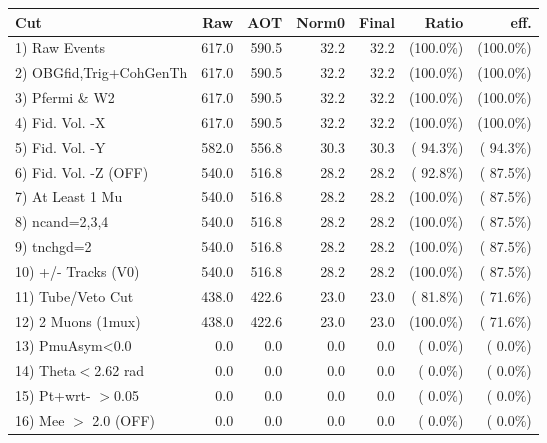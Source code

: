  \begin{table}[h!]\centering
 \begin{tabular}{||l||r|r|r|r|r|r||}
 \hline
 \hline
 Cut & Raw & AOT & Norm0 & Final & Ratio & eff.       \\
 \hline
  1) Raw Events           &        617.0 &        590.5 &         32.2 &         32.2 & (100.0\%) & (100.0\%) \\
  2) OBGfid,Trig+CohGenTh &        617.0 &        590.5 &         32.2 &         32.2 & (100.0\%) & (100.0\%) \\
  3) Pfermi \& W2         &        617.0 &        590.5 &         32.2 &         32.2 & (100.0\%) & (100.0\%) \\
  4) Fid. Vol. -X         &        617.0 &        590.5 &         32.2 &         32.2 & (100.0\%) & (100.0\%) \\
  5) Fid. Vol. -Y         &        582.0 &        556.8 &         30.3 &         30.3 & ( 94.3\%) & ( 94.3\%) \\
  6) Fid. Vol. -Z (OFF)   &        540.0 &        516.8 &         28.2 &         28.2 & ( 92.8\%) & ( 87.5\%) \\
  7) At Least 1 Mu        &        540.0 &        516.8 &         28.2 &         28.2 & (100.0\%) & ( 87.5\%) \\
  8) ncand=2,3,4          &        540.0 &        516.8 &         28.2 &         28.2 & (100.0\%) & ( 87.5\%) \\
  9) tnchgd=2             &        540.0 &        516.8 &         28.2 &         28.2 & (100.0\%) & ( 87.5\%) \\
 10) +/- Tracks (V0)      &        540.0 &        516.8 &         28.2 &         28.2 & (100.0\%) & ( 87.5\%) \\
 11) Tube/Veto Cut        &        438.0 &        422.6 &         23.0 &         23.0 & ( 81.8\%) & ( 71.6\%) \\
 12) 2 Muons (1mux)       &        438.0 &        422.6 &         23.0 &         23.0 & (100.0\%) & ( 71.6\%) \\
 13) PmuAsym<0.0          &          0.0 &          0.0 &          0.0 &          0.0 & (  0.0\%) & (  0.0\%) \\
 14) Theta$<$2.62 rad     &          0.0 &          0.0 &          0.0 &          0.0 & (  0.0\%) & (  0.0\%) \\
 15) Pt+wrt- $>$0.05      &          0.0 &          0.0 &          0.0 &          0.0 & (  0.0\%) & (  0.0\%) \\
 16) Mee $>$ 2.0  (OFF)   &          0.0 &          0.0 &          0.0 &          0.0 & (  0.0\%) & (  0.0\%) \\

\end{tabular}
\end{table}
